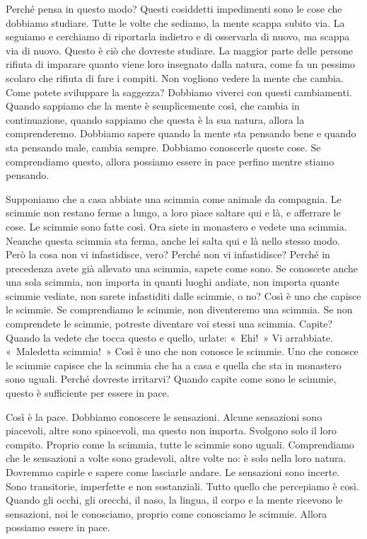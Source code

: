 Perché pensa in questo modo? Questi cosiddetti impedimenti sono le cose
che dobbiamo studiare. Tutte le volte che sediamo, la mente scappa
subito via. La seguiamo e cerchiamo di riportarla indietro e di
osservarla di nuovo, ma scappa via di nuovo. Questo è ciò che dovreste
studiare. La maggior parte delle persone rifiuta di imparare quanto
viene loro insegnato dalla natura, come fa un pessimo scolaro che
rifiuta di fare i compiti. Non vogliono vedere la mente che cambia. Come
potete sviluppare la saggezza? Dobbiamo viverci con questi cambiamenti.
Quando sappiamo che la mente è semplicemente così, che cambia in
continuazione, quando sappiamo che questa è la sua natura, allora la
comprenderemo. Dobbiamo sapere quando la mente sta pensando bene e
quando sta pensando male, cambia sempre. Dobbiamo conoscerle queste
cose. Se comprendiamo questo, allora possiamo essere in pace perfino
mentre stiamo pensando.

Supponiamo che a casa abbiate una scimmia come animale da compagnia. Le
scimmie non restano ferme a lungo, a loro piace saltare qui e là, e
afferrare le cose. Le scimmie sono fatte così. Ora siete in monastero e
vedete una scimmia. Neanche questa scimmia sta ferma, anche lei salta
qui e là nello stesso modo. Però la cosa non vi infastidisce, vero?
Perché non vi infastidisce? Perché in precedenza avete già allevato una
scimmia, sapete come sono. Se conoscete anche una sola scimmia, non
importa in quanti luoghi andiate, non importa quante scimmie vediate,
non sarete infastiditi dalle scimmie, o no? Così è uno che capisce le
scimmie. Se comprendiamo le scimmie, non diventeremo una scimmia. Se non
comprendete le scimmie, potreste diventare voi stessi una scimmia.
Capite? Quando la vedete che tocca questo e quello, urlate: «~Ehi!~» Vi
arrabbiate. «~Maledetta scimmia!~» Così è uno che non conosce le
scimmie. Uno che conosce le scimmie capisce che la scimmia che ha a casa
e quella che sta in monastero sono uguali. Perché dovreste irritarvi?
Quando capite come sono le scimmie, questo è sufficiente per essere in
pace.

Così è la pace. Dobbiamo conoscere le sensazioni. Alcune sensazioni sono
piacevoli, altre sono spiacevoli, ma questo non importa. Svolgono solo
il loro compito. Proprio come la scimmia, tutte le scimmie sono uguali.
Comprendiamo che le sensazioni a volte sono gradevoli, altre volte no: è
solo nella loro natura. Dovremmo capirle e sapere come lasciarle andare.
Le sensazioni sono incerte. Sono transitorie, imperfette e non
sostanziali. Tutto quello che percepiamo è così. Quando gli occhi, gli
orecchi, il naso, la lingua, il corpo e la mente ricevono le sensazioni,
noi le conosciamo, proprio come conosciamo le scimmie. Allora possiamo
essere in pace.


